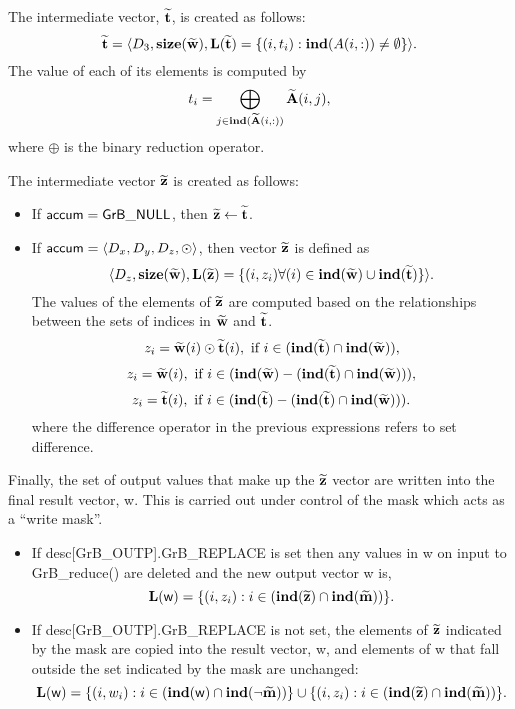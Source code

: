 The intermediate vector, ${\bf \widetilde{t}}$, is created as follows:
\[ 
{\bf \widetilde{t}} = \langle
D_3, \bold{size}({\bf \widetilde{w}}),
\bold{L}({\bf \widetilde{t}}) =
\{(i,t_i) : \bold{ind}(A(i,:)) \neq \emptyset   \} \rangle. 
\]
The value of each of its elements is computed by
\[
	t_i = \bigoplus_{j \in \bold{ind}({\bf \widetilde{A}}(i,:))} {\bf \widetilde{A}}(i,j), 
\]
where $\oplus$ is the binary reduction operator.

The intermediate vector ${\bf \widetilde{z}}$ is created as follows:
\begin{itemize}
    \item If ${\sf accum} = {\sf GrB\_NULL}$, then ${\bf \widetilde{z}} \leftarrow {\bf \widetilde{t}}$.

    \item If ${\sf accum} = \langle D_x, D_y, D_z, \odot \rangle$, then vector ${\bf \widetilde{z}}$ is defined as 
        \[ \langle D_z, \bold{size}({\bf \widetilde{w}}), \bold{L}({\bf \widetilde{z}})
		= \{(i,z_{i})  \forall (i) \in \bold{ind}({\bf \widetilde{w}}) \cup 
        \bold{ind}({\bf \widetilde{t}}) \} \rangle.\]
    The values of the elements of ${\bf \widetilde{z}}$ are computed based on the relationships between the sets of indices in ${\bf \widetilde{w}}$ and ${\bf \widetilde{t}}$.
\[
z_{i} = {\bf \widetilde{w}}(i) \odot {\bf \widetilde{t}}(i), \mbox{~if~}  i \in  (\bold{ind}({\bf \widetilde{t}}) \cap \bold{ind}({\bf \widetilde{w}})),
\]
\[
z_{i} = {\bf \widetilde{w}}(i), \mbox{~if~}  i \in  (\bold{ind}({\bf \widetilde{w}}) - (\bold{ind}({\bf \widetilde{t}}) \cap \bold{ind}({\bf \widetilde{w}}))),
\]
\[
z_{i} = {\bf \widetilde{t}}(i), \mbox{~if~}  i \in  (\bold{ind}({\bf \widetilde{t}}) - (\bold{ind}({\bf \widetilde{t}}) \cap \bold{ind}({\bf \widetilde{w}}))).
\]
where the difference operator in the previous expressions refers to set difference.
\end{itemize}

Finally, the set of output values that make up the ${\bf \widetilde{z}}$ 
vector are written into the final result vector, {\sf w}. 
This is carried out under control of the mask which acts as a ``write mask''.
\begin{itemize}
\item If {\sf desc[GrB\_OUTP].GrB\_REPLACE} is set then any values in {\sf w} 
on input to {\sf GrB\_reduce()} are deleted and the new output vector {\sf w} is,
\[ \bold{L}({\sf w}) = \{(i,z_{i}) : i \in (\bold{ind}({\bf \widetilde{z}}) 
\cap \bold{ind}({\bf \widetilde{m}})) \}. \]

\item If {\sf desc[GrB\_OUTP].GrB\_REPLACE} is not set, the elements of 
${\bf \widetilde{z}}$ indicated by 
the mask are copied into the result vector, {\sf w}, and elements of 
{\sf w} that fall outside the set indicated by the mask are unchanged:
\[ \bold{L}({\sf w}) = \{(i,w_{i}) : i \in (\bold{ind}({\sf w}) 
\cap \bold{ind}(\neg {\bf \widetilde{m}})) \} \cup \{(i,z_{i}) : i \in 
(\bold{ind}({\bf \widetilde{z}}) \cap \bold{ind}({\bf \widetilde{m}})) \}. \]
\end{itemize}

